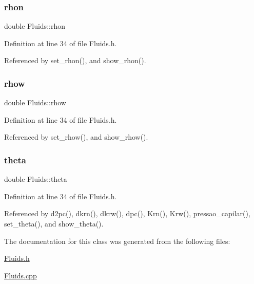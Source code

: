 \mbox{\label{classFluids_a0a06cdfa97511a3e2fd4e0cdb2cdaba5}} 
\subsubsection{\texorpdfstring{rhon}{rhon}}
{\footnotesize\ttfamily double Fluids\+::rhon\hspace{0.3cm}{\ttfamily [private]}}



Definition at line 34 of file Fluids.\+h.



Referenced by set\+\_\+rhon(), and show\+\_\+rhon().

\mbox{\label{classFluids_a1967a64f25be380857f24ac62b532693}} 
\subsubsection{\texorpdfstring{rhow}{rhow}}
{\footnotesize\ttfamily double Fluids\+::rhow\hspace{0.3cm}{\ttfamily [private]}}



Definition at line 34 of file Fluids.\+h.



Referenced by set\+\_\+rhow(), and show\+\_\+rhow().

\mbox{\label{classFluids_aff18bebcaee137af75b319822a9dd8a8}} 
\subsubsection{\texorpdfstring{theta}{theta}}
{\footnotesize\ttfamily double Fluids\+::theta\hspace{0.3cm}{\ttfamily [private]}}



Definition at line 34 of file Fluids.\+h.



Referenced by d2pc(), dkrn(), dkrw(), dpc(), Krn(), Krw(), pressao\+\_\+capilar(), set\+\_\+theta(), and show\+\_\+theta().



The documentation for this class was generated from the following files\+:\begin{DoxyCompactItemize}
\item 
\hyperlink{Fluids_8h}{Fluids.\+h}\item 
\hyperlink{Fluids_8cpp}{Fluids.\+cpp}\end{DoxyCompactItemize}

